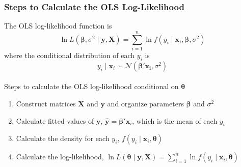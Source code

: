 \documentclass{beamer}\usepackage[]{graphicx}\usepackage[]{color}
\begin{document}
\begin{frame}\frametitle{Steps to Calculate the OLS Log-Likelihood}
    The OLS log-likelihood function is
    $$\ln L(\bm{\beta}, \sigma^2 \mid \bm{y}, \bm{X}) = \sum_{i = 1}^n \ln f(y_i \mid \bm{x_i}, \bm{\beta}, \sigma^2)$$
    where the conditional distribution of each $y_i$ is
    $$y_i \mid \bm{x}_i \sim \mathcal{N}(\bm{\beta}' \bm{x_i}, \sigma^2)$$ \\
    \vspace{2ex}
    Steps to calculate the OLS log-likelihood conditional on $\bm{\theta}$
    \begin{enumerate}
        \item Construct matrices $\bm{X}$ and $\bm{y}$ and organize parameters $\bm{\beta}$ and $\sigma^2$
        \item Calculate fitted values of $\bm{y}$, $\widehat{\bm{y}} = \bm{\beta}' \bm{x}_i$, which is the mean of each $y_i$
        \item Calculate the density for each $y_i$, $f(y_i \mid \bm{x}_i, \bm{\theta})$
        \item Calculate the log-likelihood, $\ln L(\bm{\theta} \mid \bm{y}, \bm{X}) = \sum_{i = 1}^n \ln f(y_i \mid \bm{x}_i, \bm{\theta})$
    \end{enumerate}
\end{frame}
\end{document}

